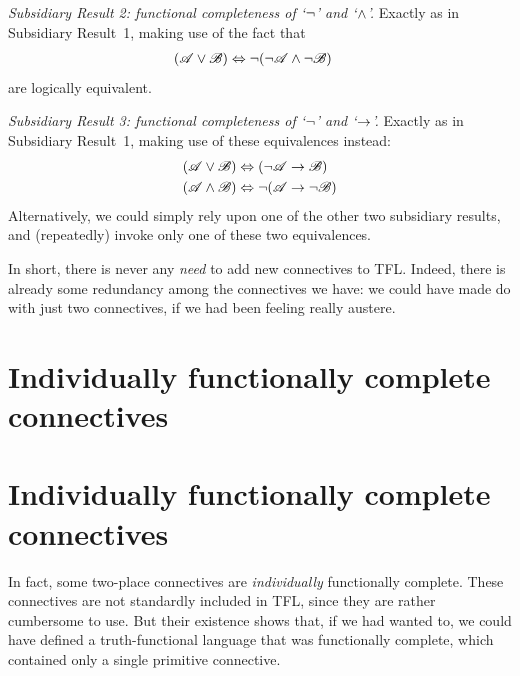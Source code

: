 \emph{Subsidiary Result 2: functional completeness of `$\neg$' and `$\wedge$'.} Exactly as in Subsidiary Result~1, making use of the fact that
		\begin{align*}
		(\mathscr{A} \vee \mathscr{B}) & \Leftrightarrow \neg(\neg \mathscr{A} \wedge\neg \mathscr{B})
		\end{align*}
are logically equivalent.

\emph{Subsidiary Result 3: functional completeness of `$\neg$' and `$\rightarrow$'.} Exactly as in Subsidiary Result~1, making use of these equivalences instead:
		\begin{align*}
		(\mathscr{A} \vee \mathscr{B}) &\Leftrightarrow (\neg \mathscr{A} \rightarrow \mathscr{B})\\
		(\mathscr{A} \wedge \mathscr{B}) &\Leftrightarrow \neg(\mathscr{A} \rightarrow \neg\mathscr{B})
		\end{align*}
Alternatively, we could simply rely upon one of the other two subsidiary results, and (repeatedly) invoke only one of these two equivalences.

In short, there is never any \emph{need} to add new connectives to TFL. Indeed, there is already some redundancy among the connectives we have: we could have made do with just two connectives, if we had been feeling really austere.

\ifHTMLtarget
\section{Individually functionally complete connectives}
\else
\section[Individually functionally complete connectives][Functionally complete connectives]{Individually functionally complete connectives}
\fi

In fact, some two-place connectives are \emph{individually} functionally complete. These connectives are not standardly included in TFL, since they are rather cumbersome to use. But their existence shows that, if we had wanted to, we could have defined a truth-functional language that was functionally complete, which contained only a single primitive connective.

